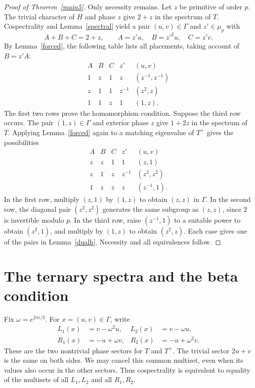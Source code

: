 \documentclass[11pt]{article}
\theoremstyle{remark}\newtheorem{remark}[theorem]{Remark}
\begin{document}
\begin{proof}[Proof of Theorem~\ref{main5}]
Only necessity remains. Let $z$ be primitive of order $p$. The trivial character of $H$ and phase $z$ give $2+z$ in the spectrum of $T$. Cospectrality and Lemma~\ref{spectral} yield a pair $(u,v)\in\Gamma$ and $z'\in\mu_p$ with
\[
A+B+C=2+z,\qquad A=z'u,\quad B=z'^2u,\quad C=z'v.
\]
By Lemma~\ref{forced}, the following table lists all placements, taking account of $B=z'A$:
\[
\begin{array}{c|c|c|c|c}
A&B&C&z'&(u,v)\\\hline
1&z&1&z&(z^{-1},z^{-1})\\
z&1&1&z^{-1}&(z^2,z)\\
1&1&z&1&(1,z).
\end{array}
\]
The first two rows prove the homomorphism condition. Suppose the third row occurs. The pair $(1,z)\in\Gamma$ and exterior phase $z$ give $1+2z$ in the spectrum of $T$. Applying Lemma~\ref{forced} again to a matching eigenvalue of $T^+$ gives the possibilities
\[
\begin{array}{c|c|c|c|c}
A&B&C&z'&(u,v)\\\hline
z&z&1&1&(z,1)\\
z&1&z&z^{-1}&(z^2,z^2)\\
1&z&z&z&(z^{-1},1).
\end{array}
\]
In the first row, multiply $(z,1)$ by $(1,z)$ to obtain $(z,z)$ in $\Gamma$. In the second row, the diagonal pair $(z^2,z^2)$ generates the same subgroup as $(z,z)$, since $2$ is invertible modulo $p$. In the third row, raise $(z^{-1},1)$ to a suitable power to obtain $(z^2,1)$, and multiply by $(1,z)$ to obtain $(z^2,z)$. Each case gives one of the pairs in Lemma~\ref{dualh}. Necessity and all equivalences follow.
\end{proof}

\section{The ternary spectra and the beta condition}
Fix $\omega=e^{2\pi i/3}$. For $x=(u,v)\in\Gamma$, write
\begin{equation}\label{LR}
\begin{aligned}
L_1(x)&=v-\omega^2u,& L_2(x)&=v-\omega u,\\
R_1(x)&=-u+\omega v,& R_2(x)&=-u+\omega^2v.
\end{aligned}
\end{equation}
These are the two nontrivial phase sectors for $T$ and $T^+$. The trivial sector $2u+v$ is the same on both sides. We may cancel this common multiset, even when its values also occur in the other sectors. Thus cospectrality is equivalent to equality of the multisets of all $L_1,L_2$ and all $R_1,R_2$.
\end{document}
